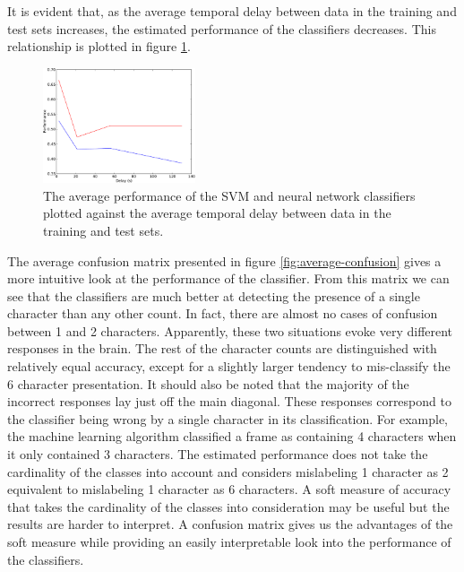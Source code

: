 \documentclass[preprint,5p,authoryear]{elsarticle}
\begin{document}
It is evident that, as the average temporal delay between data in the training and test sets increases, the estimated performance of the classifiers decreases.
This relationship is plotted in figure \ref{fig:performance-verse-temporal-distance}.

\begin{figure}
\centering
\includegraphics[width=0.4\textwidth]{figures/performance-verse-temporal-distance}
\caption{The average performance of the SVM and neural network classifiers plotted against the average temporal delay between data in the training and test sets.}
\label{fig:performance-verse-temporal-distance}
\end{figure}

The average confusion matrix presented in figure \ref{fig:average-confusion} gives a more intuitive look at the performance of the classifier.
From this matrix we can see that the classifiers are much better at detecting the presence of a single character than any other count.
In fact, there are almost no cases of confusion between 1 and 2 characters.
Apparently, these two situations evoke very different responses in the brain.
The rest of the character counts are distinguished with relatively equal accuracy,
except for a slightly larger tendency to mis-classify the 6 character presentation.
It should also be noted that the majority of the incorrect responses lay just off the main diagonal.
These responses correspond to the classifier being wrong by a single character in its classification.
For example, the machine learning algorithm classified a frame as containing 4 characters when it only contained 3 characters.
The estimated performance does not take the cardinality of the classes into account and considers mislabeling 1 character as 2 equivalent to mislabeling 1 character as 6 characters.
A soft measure of accuracy that takes the cardinality of the classes into consideration may be useful but the results are harder to interpret.
A confusion matrix gives us the advantages of the soft measure while providing an easily interpretable look into the performance of the classifiers.
\end{document}
